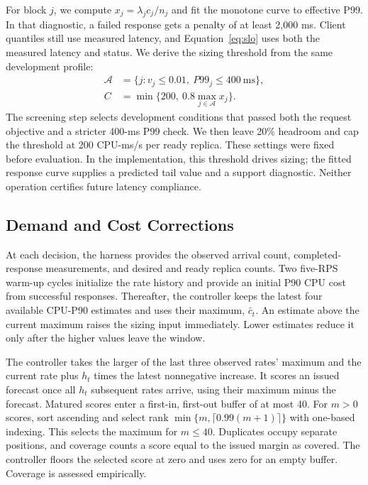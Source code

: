 \documentclass[10pt,twocolumn,a4paper]{article}
\begin{document}
For block $j$, we compute $x_j=\lambda_jc_j/n_j$ and fit the monotone curve to effective P99. In that diagnostic, a failed response gets a penalty of at least 2,000 ms. Client quantiles still use measured latency, and Equation~\ref{eq:slo} uses both the measured latency and status. We derive the sizing threshold from the same development profile:
\begin{align}
\mathcal A&=\{j:v_j\leq0.01,\ P99_j\leq400\mathrm{\ ms}\},\\
C&=\min\{200,\ 0.8\max_{j\in\mathcal A}x_j\}.\label{eq:capacity}
\end{align}
The screening step selects development conditions that passed both the request objective and a stricter 400-ms P99 check. We then leave 20\% headroom and cap the threshold at 200 CPU-ms/s per ready replica. These settings were fixed before evaluation. In the implementation, this threshold drives sizing; the fitted response curve supplies a predicted tail value and a support diagnostic. Neither operation certifies future latency compliance.

\subsection{Demand and Cost Corrections}
At each decision, the harness provides the observed arrival count, completed-response measurements, and desired and ready replica counts. Two five-RPS warm-up cycles initialize the rate history and provide an initial P90 CPU cost from successful responses. Thereafter, the controller keeps the latest four available CPU-P90 estimates and uses their maximum, $\bar c_t$. An estimate above the current maximum raises the sizing input immediately. Lower estimates reduce it only after the higher values leave the window.

The controller takes the larger of the last three observed rates' maximum and the current rate plus $h_t$ times the latest nonnegative increase. It scores an issued forecast once all $h_t$ subsequent rates arrive, using their maximum minus the forecast. Matured scores enter a first-in, first-out buffer of at most 40. For $m>0$ scores, sort ascending and select rank $\min\{m,\lceil0.99(m+1)\rceil\}$ with one-based indexing. This selects the maximum for $m\leq40$. Duplicates occupy separate positions, and coverage counts a score equal to the issued margin as covered. The controller floors the selected score at zero and uses zero for an empty buffer. Coverage is assessed empirically.
\end{document}
